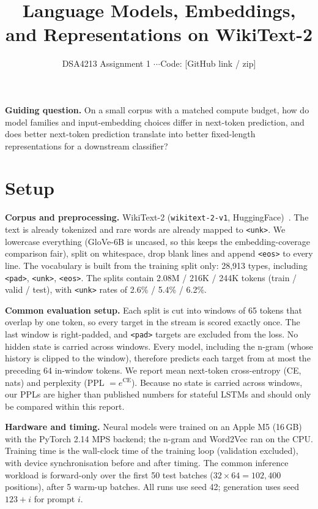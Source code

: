 \documentclass[10pt,a4paper]{article}
\title{\vspace{-8mm}\textbf{Language Models, Embeddings, and Representations on WikiText-2}}
\author{DSA4213 Assignment 1 \quad$\cdot$\quad [Your Name] \quad$\cdot$\quad [Matric No.] \quad$\cdot$\quad Code: [GitHub link / zip]}
\date{\vspace{-6mm}}
\newcommand{\tok}[1]{\texttt{\small #1}}
\begin{document}
\maketitle

\textbf{\color{accent}Guiding question.} On a small corpus with a matched compute budget, how do model families and input-embedding choices differ in next-token prediction, and does better next-token prediction translate into better fixed-length representations for a downstream classifier?

\section{Setup}
\textbf{Corpus and preprocessing.} WikiText-2 (\tok{wikitext-2-v1}, HuggingFace)~\cite{merity2016}. The text is already tokenized and rare words are already mapped to \tok{<unk>}. We lowercase everything (GloVe-6B is uncased, so this keeps the embedding-coverage comparison fair), split on whitespace, drop blank lines and append \tok{<eos>} to every line. The vocabulary is built from the training split only: 28,913 types, including \tok{<pad>}, \tok{<unk>}, \tok{<eos>}. The splits contain 2.08M / 216K / 244K tokens (train / valid / test), with \tok{<unk>} rates of 2.6\% / 5.4\% / 6.2\%.

\textbf{Common evaluation setup.} Each split is cut into windows of 65 tokens that overlap by one token, so every target in the stream is scored exactly once. The last window is right-padded, and \tok{<pad>} targets are excluded from the loss. No hidden state is carried across windows. Every model, including the n-gram (whose history is clipped to the window), therefore predicts each target from at most the preceding 64 in-window tokens. We report mean next-token cross-entropy (CE, nats) and perplexity (PPL $=e^{\mathrm{CE}}$). Because no state is carried across windows, our PPLs are higher than published numbers for stateful LSTMs and should only be compared within this report.

\textbf{Hardware and timing.} Neural models were trained on an Apple M5 (16\,GB) with the PyTorch 2.14 MPS backend; the n-gram and Word2Vec ran on the CPU. Training time is the wall-clock time of the training loop (validation excluded), with device synchronisation before and after timing. The common inference workload is forward-only over the first 50 test batches ($32\times64 = 102{,}400$ positions), after 5 warm-up batches. All runs use seed 42; generation uses seed $123+i$ for prompt $i$.
\end{document}
